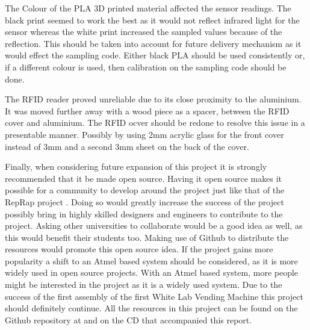 \documentclass[a4paper,11pt]{article}
\numberwithin{figure}{section}
\numberwithin{table}{section}
\begin{document}
The Colour of the PLA 3D printed material affected the sensor readings. The black print seemed to work the best as it would not reflect infrared light for the sensor whereas the white print increased the sampled values because of the reflection. This should be taken into account for future delivery mechanism as it would effect the sampling code. Either black PLA should be used consistently or, if a different colour is used, then calibration on the sampling code should be done.

The RFID reader proved unreliable due to its close proximity to the aluminium. It was moved further away with a wood piece as a spacer, between the RFID cover and aluminium. The RFID ocver should be redone to resolve this issue in a presentable manner. Possibly by using 2mm acrylic glass for the front cover instead of 3mm and a second 3mm sheet on the back of the cover. 

Finally, when considering future expansion of this project it is strongly recommended that it be made open source. Having it open source makes it possible for a community to develop around the project just like that of the RepRap project \cite{reprap}. Doing so would greatly increase the success of the project possibly bring in highly skilled designers and engineers to contribute to the project. Asking other universities to collaborate would be a good idea as well, as this would benefit their students too. Making use of Github to distribute the resources would promote this open source idea. If the project gains more popularity a shift to an Atmel based system should be considered, as it is more widely used in open source projects. With an Atmel based system, more people might be interested in the project as it is a widely used system. Due to the success of the first assembly of the first White Lab Vending Machine this project should definitely continue. All the resources in this project can be found on the Github repository at \cite{github} and on the CD that accompanied this report.
\newpage




\newpage
\end{document}
